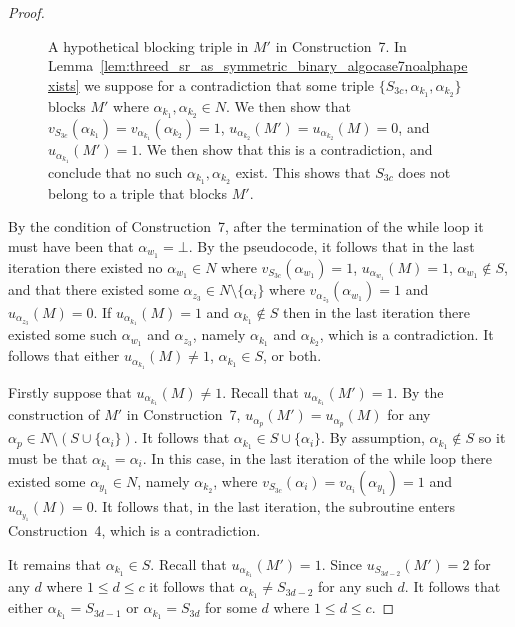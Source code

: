 \begin{proof}
\begin{figure}[ht]
    \centering
    
    \caption[A hypothetical blocking triple in $M'$ in Construction~7]{A hypothetical blocking triple in $M'$ in Construction~7. In Lemma~\ref{lem:threed_sr_as_symmetric_binary_algocase7noalphapexists} we suppose for a contradiction that some triple $\{ S_{3c}, \alpha_{k_1}, \alpha_{k_2} \}$ blocks $M'$ where $\alpha_{k_1}, \alpha_{k_2}\in N$. We then show that $v_{S_{3c}}(\alpha_{k_1})=v_{\alpha_{k_1}}(\alpha_{k_2})=1$, $u_{\alpha_{k_2}}(M')=u_{\alpha_{k_2}}(M)=0$, and $u_{\alpha_{k_1}}(M')=1$. We then show that this is a contradiction, and conclude that no such $\alpha_{k_1}, \alpha_{k_2}$ exist. This shows that $S_{3c}$ does not belong to a triple that blocks $M'$.}
    \label{fig:threed_sr_as_symmetric_binary_repair_algorithm_proof_case_7_explanation_1}
\end{figure}

By the condition of Construction~7, after the termination of the while loop it must have been that $\alpha_{w_1}=\bot$. By the pseudocode, it follows that in the last iteration there existed no $\alpha_{w_1} \in N$ where $v_{S_{3c}}(\alpha_{w_1})=1$, $u_{\alpha_{w_1}}(M)=1$, $\alpha_{w_1}\notin S$, and that there existed some $\alpha_{z_3}\in N\setminus \{ \alpha_i \}$ where $v_{\alpha_{z_3}}(\alpha_{w_1})=1$ and $u_{\alpha_{z_3}}(M)=0$. If $u_{\alpha_{k_1}}(M)=1$ and $\alpha_{k_1}\notin S$ then in the last iteration there existed some such $\alpha_{w_1}$ and $\alpha_{z_3}$, namely $\alpha_{k_1}$ and $\alpha_{k_2}$, which is a contradiction. It follows that either $u_{\alpha_{k_1}}(M) \neq 1$, $\alpha_{k_1}\in S$, or both.

Firstly suppose that $u_{\alpha_{k_1}}(M)\neq 1$. Recall that $u_{\alpha_{k_1}}(M')=1$. By the construction of $M'$ in Construction~7, $u_{\alpha_p}(M') = u_{\alpha_p}(M)$ for any $\alpha_p \in N \setminus (S \cup \{ \alpha_i \})$. It follows that $\alpha_{k_1} \in S \cup \{ \alpha_i \}$. By assumption, $\alpha_{k_1} \notin S$ so it must be that $\alpha_{k_1} = \alpha_i$. In this case, in the last iteration of the while loop there existed some $\alpha_{y_1} \in N$, namely $\alpha_{k_2}$, where $v_{S_{3c}}(\alpha_i)=v_{\alpha_i}(\alpha_{y_1})=1$ and $u_{\alpha_{y_1}}(M)=0$. It follows that, in the last iteration, the subroutine enters Construction~4, which is a contradiction. 

It remains that $\alpha_{k_1}\in S$. Recall that $u_{\alpha_{k_1}}(M')=1$. Since $u_{S_{3d-2}}(M')=2$ for any $d$ where $1\leq d\leq c$ it follows that $\alpha_{k_1} \neq S_{3d-2}$ for any such $d$. It follows that either $\alpha_{k_1} = S_{3d-1}$ or $\alpha_{k_1} = S_{3d}$ for some $d$ where $1\leq d\leq c$.


\end{proof}
